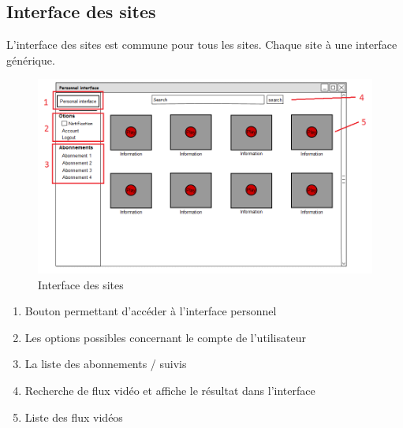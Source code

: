 \documentclass[11pt]{report} %
\begin{document}
		\subsection{Interface des sites}
		L'interface des sites est commune pour tous les sites. Chaque site à une interface générique. 
		\begin{figure}[h]
			\center
			\includegraphics[width=1\textwidth]{../img/serviceInterfacenum.png}
			\caption{Interface des sites}
			\label{interfacesites}
		\end{figure}
		
		\begin{enumerate}
			\item Bouton permettant d'accéder à l'interface personnel
			\item Les options possibles concernant le compte de l'utilisateur
			\item La liste des abonnements / suivis 
			\item Recherche de flux vidéo et affiche le résultat dans l'interface
			\item Liste des flux vidéos
		\end{enumerate}

		\newpage
\end{document}
